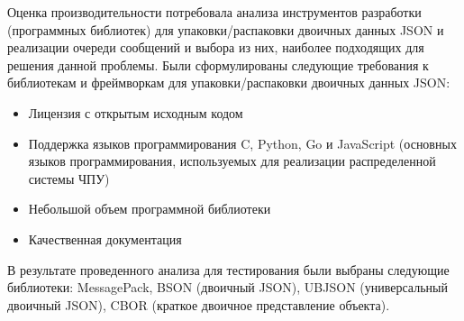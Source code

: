 Оценка производительности потребовала анализа инструментов разработки (программных библиотек) для упаковки/распаковки двоичных данных JSON и реализации очереди сообщений и выбора из них, наиболее подходящих для решения данной проблемы. Были сформулированы следующие требования к библиотекам и фреймворкам для упаковки/распаковки двоичных данных JSON:
\begin{itemize}
\item Лицензия с открытым исходным кодом
\item Поддержка языков программирования C, Python, Go и JavaScript (основных языков программирования, используемых для реализации распределенной системы ЧПУ)
\item Небольшой объем программной библиотеки
\item Качественная документация
\end{itemize}


В результате проведенного анализа для тестирования были выбраны следующие библиотеки: MessagePack, BSON (двоичный JSON), UBJSON (универсальный двоичный JSON), CBOR (краткое двоичное представление объекта).



